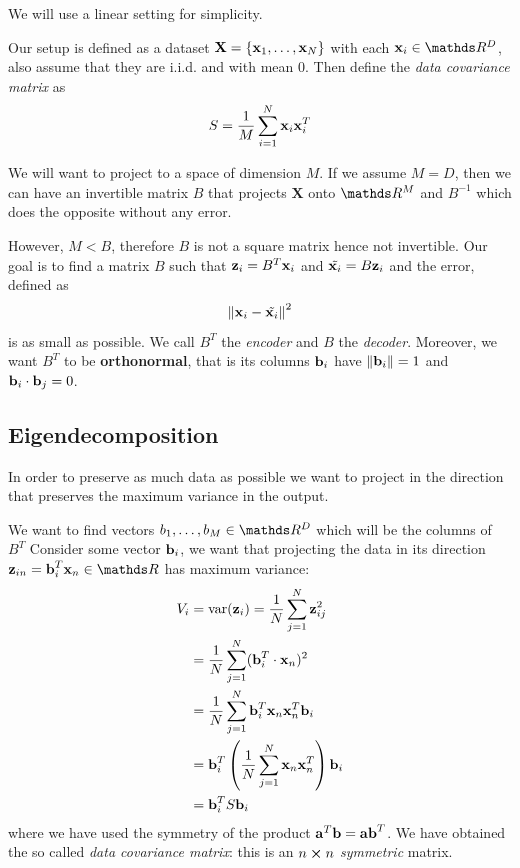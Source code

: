 \documentclass[12pt]{extarticle}
\renewcommand{\vec}[1]{\bvec{#1}}
\begin{document}
We will use a linear setting for simplicity.

Our setup is defined as a dataset $\vec X = \{ \vec x_1, \dots, \vec x_N\}$
with each $\vec x_i \in \R^D$, also assume that they are i.i.d. and with mean $0$.
Then define the \emph{data covariance matrix} as
\begin{equation}
	S = \frac{1}{M} \sum_{i = 1}^N \vec x_i \vec x_i^T
\end{equation}

We will want to project to a space of dimension $M$. If we assume $M = D$, then we can have
an invertible matrix $B$ that projects $\bm X$ onto $\R^M$ and $B^{-1}$ which does the opposite
without any error.

However, $M < B$, therefore $B$ is not a square matrix hence not invertible.
Our goal is to find a matrix $B$ such that $\vec z_i = B^T \vec x_i$ and
$\tilde{\vec x_i} = B \vec z_i$ and the error, defined as
\begin{equation}
	\norm{\vec x_i - \tilde{\vec x_i}}^2
\end{equation}
is as small as possible.
We call $B^T$ the \emph{encoder} and $B$ the \emph{decoder}.
Moreover, we want $B^T$ to be \textbf{orthonormal},
that is its columns $\vec b_i$ have $\norm{\vec b_i} = 1$ and $\vec b_i \cdot \vec b_j = 0$.

\subsection{Eigendecomposition}

In order to preserve as much data as possible we want to project in the direction that preserves
the maximum variance in the output.

We want to find vectors $b_1, \dots, b_M \in \R^D$ which will be the columns of $B^T$
Consider some vector $\vec b_i$, we want that projecting the data in its direction
$\vec z_{in} = \vec b_i^T \vec x_n \in \R$ has maximum variance:
\begin{align}
	V_i & = \mathrm{var} (\vec z_i) = \frac{1}{N} \sum^N_{j = 1} \vec z_{ij}^2               \\
	    & = \frac{1}{N} \sum^N_{j = 1} (\vec b_i^T \cdot \vec x_n)^2                         \\
	    & = \frac{1}{N} \sum^N_{j = 1} \vec b_i^T \vec x_n \vec x_n^T \vec b_i               \\
	    & = \vec b_i^T \left(\frac{1}{N} \sum^N_{j = 1} \vec x_n \vec x_n^T \right) \vec b_i \\
	    & = \vec b_i^T S \vec b_i
\end{align}
where we have used the symmetry of the product $\vec a^T \vec b = \vec a \vec b^T$.
We have obtained the so called \emph{data covariance matrix}: this is an $n \cross n$
\emph{symmetric} matrix.
\end{document}
